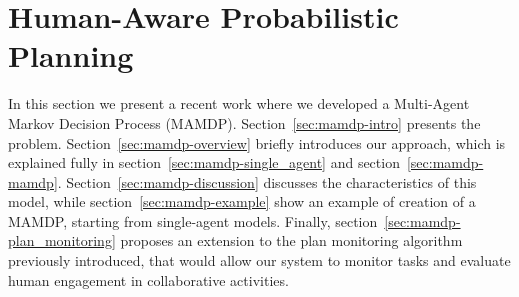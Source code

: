 \chapter{Human-Aware Probabilistic Planning}
\label{chapter:mamdp}


In this section we present a recent work where we developed a Multi-Agent Markov Decision Process (MAMDP). Section~\ref{sec:mamdp-intro} presents the problem. Section~\ref{sec:mamdp-overview} briefly introduces our approach, which is explained fully in section~\ref{sec:mamdp-single_agent} and section~\ref{sec:mamdp-mamdp}. Section~\ref{sec:mamdp-discussion} discusses the characteristics of this model, while section~\ref{sec:mamdp-example} show an example of creation of a MAMDP, starting from single-agent models. Finally, section~\ref{sec:mamdp-plan_monitoring} proposes an extension to the plan monitoring algorithm previously introduced, that would allow our system to monitor tasks and evaluate human engagement in collaborative activities.


